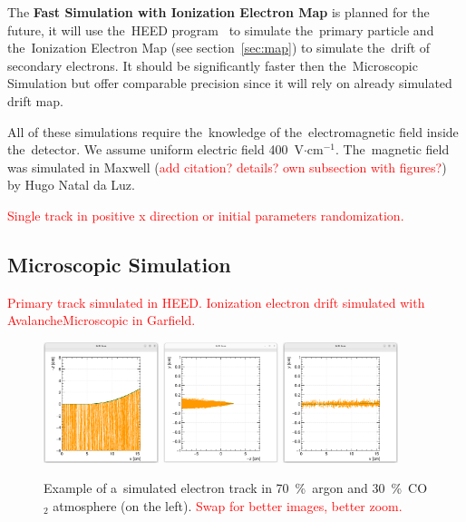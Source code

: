 \documentclass[]{article}
\begin{document}
		The \textbf{Fast Simulation with Ionization Electron Map} is planned for the future, it will use the~HEED program~\cite{HEED} to simulate the~primary particle and the~Ionization Electron Map (see section~\ref{sec:map}) to simulate the~drift of secondary electrons. It should be significantly faster then the~Microscopic Simulation but offer comparable precision since it will rely on already simulated drift map.
		
		All of these simulations require the~knowledge of the~electromagnetic field inside the~detector. We assume uniform electric field 400~V$\cdot$cm$^{-1}$. The~magnetic field was simulated in Maxwell (\textcolor{red}{add citation? details? own subsection with figures?}) by Hugo Natal da Luz.
	
		\textcolor{red}{Single track in positive x direction or initial parameters randomization.}
	
		\subsection{Microscopic Simulation}
			\textcolor{red}{Primary track simulated in HEED. Ionization electron drift simulated with AvalancheMicroscopic in Garfield.}
			
			\begin{figure}
				\centering
				\includegraphics[width=0.3\textwidth]{7030_xz.png}
				\includegraphics[width=0.3\textwidth]{7030_yz.png}
				\includegraphics[width=0.3\textwidth]{7030_xy.png}
				\caption{Example of a~simulated electron track in 70~\%~argon and 30~\%~CO$_2$ atmosphere (on the left). \textcolor{red}{Swap for better images, better zoom.}}
				\label{fig:7030sim}
			\end{figure}
			
\end{document}
